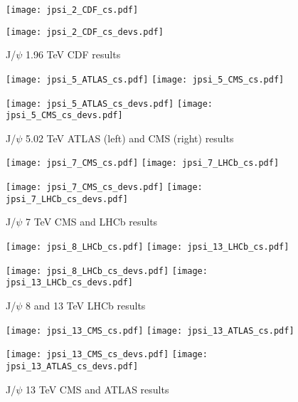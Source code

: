 \documentclass{article}
\begin{document}

\begin{figure}
\centering
\texttt{[image: jpsi\_2\_CDF\_cs.pdf]}

\texttt{[image: jpsi\_2\_CDF\_cs\_devs.pdf]}
\caption{J/$\psi$ 1.96 TeV CDF results}
\end{figure}

\clearpage

\begin{figure}
\centering
\texttt{[image: jpsi\_5\_ATLAS\_cs.pdf]}
\texttt{[image: jpsi\_5\_CMS\_cs.pdf]}

\texttt{[image: jpsi\_5\_ATLAS\_cs\_devs.pdf]}
\texttt{[image: jpsi\_5\_CMS\_cs\_devs.pdf]}
\caption{J/$\psi$ 5.02 TeV ATLAS (left) and CMS (right) results}
\end{figure}

\clearpage

\begin{figure}
\centering
\texttt{[image: jpsi\_7\_CMS\_cs.pdf]}
\texttt{[image: jpsi\_7\_LHCb\_cs.pdf]}

\texttt{[image: jpsi\_7\_CMS\_cs\_devs.pdf]}
\texttt{[image: jpsi\_7\_LHCb\_cs\_devs.pdf]}
\caption{J/$\psi$ 7 TeV CMS and LHCb results}
\end{figure}

\clearpage

\begin{figure}
\centering
\texttt{[image: jpsi\_8\_LHCb\_cs.pdf]}
\texttt{[image: jpsi\_13\_LHCb\_cs.pdf]}

\texttt{[image: jpsi\_8\_LHCb\_cs\_devs.pdf]}
\texttt{[image: jpsi\_13\_LHCb\_cs\_devs.pdf]}
\caption{J/$\psi$ 8 and 13 TeV LHCb results}
\end{figure}

\clearpage

\begin{figure}
\centering
\texttt{[image: jpsi\_13\_CMS\_cs.pdf]}
\texttt{[image: jpsi\_13\_ATLAS\_cs.pdf]}

\texttt{[image: jpsi\_13\_CMS\_cs\_devs.pdf]}
\texttt{[image: jpsi\_13\_ATLAS\_cs\_devs.pdf]}
\caption{J/$\psi$ 13 TeV CMS and ATLAS results}
\end{figure}
\end{document}
